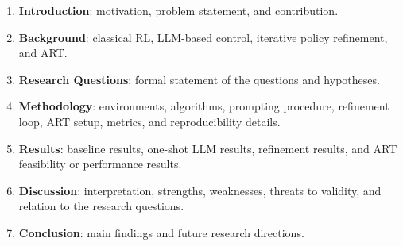 \documentclass[11pt,a4paper]{article}
\begin{document}
\begin{enumerate}
    \item \textbf{Introduction}: motivation, problem statement, and contribution.
    \item \textbf{Background}: classical RL, LLM-based control, iterative policy refinement, and ART.
    \item \textbf{Research Questions}: formal statement of the questions and hypotheses.
    \item \textbf{Methodology}: environments, algorithms, prompting procedure, refinement loop, ART setup, metrics, and reproducibility details.
    \item \textbf{Results}: baseline results, one-shot LLM results, refinement results, and ART feasibility or performance results.
    \item \textbf{Discussion}: interpretation, strengths, weaknesses, threats to validity, and relation to the research questions.
    \item \textbf{Conclusion}: main findings and future research directions.
\end{enumerate}
\end{document}
